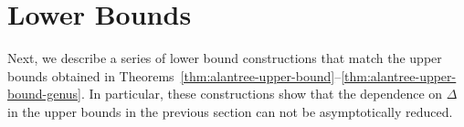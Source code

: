 \documentclass{patmorin}
\begin{document}


\section{Lower Bounds}

Next, we describe a series of lower bound
constructions that match the upper bounds obtained in
Theorems~\ref{thm:alantree-upper-bound}--\ref{thm:alantree-upper-bound-genus}.
In particular, these constructions show that the dependence on $\Delta$
in the upper bounds in the previous section can not be asymptotically
reduced.

%
%
\end{document}
